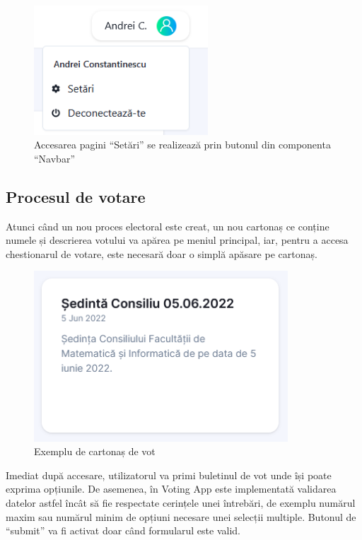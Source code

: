 \begin{figure}[!ht]
    \centering
    \includegraphics[width=65mm]{images/settings_button.png}
    \caption{Accesarea pagini \enquote{Setări} se realizează prin butonul din componenta \enquote{Navbar}}
\end{figure}

\subsection{Procesul de votare}

Atunci când un nou proces electoral este creat, un nou cartonaș ce conține numele și descrierea votului va apărea pe meniul principal, iar, pentru a accesa chestionarul de votare, este necesară doar o simplă apăsare pe cartonaș.

\begin{figure}[!ht]
    \centering
    \includegraphics[width=95mm]{images/cartonas_vot.png}
    \caption{Exemplu de cartonaș de vot}
\end{figure}

Imediat după accesare, utilizatorul va primi buletinul de vot unde își poate exprima opțiunile. De asemenea, în Voting App este implementată validarea datelor astfel încât să fie respectate cerințele unei întrebări, de exemplu numărul maxim sau numărul minim de opțiuni necesare unei selecții multiple. Butonul de \enquote{submit} va fi activat doar când formularul este valid.

